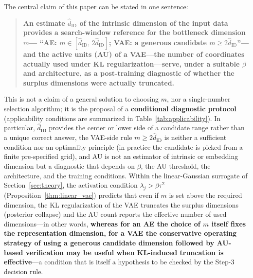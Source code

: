 \documentclass[make,article,submit,pdftex,moreauthors]{Definitions/mdpi}
\newcommand{\hatdID}{\hat{d}_{\mathrm{ID}}}
\begin{document}
The central claim of this paper can be stated in one sentence:
\begin{quote}
\textbf{An estimate $\hatdID$ of the intrinsic dimension of the input data
provides a search-window reference for the bottleneck dimension $m$---%
``AE: $m \in [\hatdID,\, 2\hatdID]$; VAE: a generous candidate
$m \geq 2\hatdID$''---and the active units (AU) of a VAE---the number of
coordinates actually used under KL regularization---serve, under a suitable
$\beta$ and architecture, as a post-training diagnostic of whether the
surplus dimensions were actually truncated.}
\end{quote}
This is not a claim of a general solution to choosing $m$, nor a
single-number selection algorithm; it is the proposal of a
\textbf{conditional diagnostic protocol}
(applicability conditions are summarized in
Table~\ref{tab:applicability}).
In particular, $\hatdID$ provides the center or lower side of a candidate
range rather than a unique correct answer, the VAE-side rule
$m \geq 2\hatdID$ is neither a sufficient condition nor an optimality
principle (in practice the candidate is picked from a finite pre-specified
grid), and AU is not an estimator of intrinsic or embedding dimension but a
diagnostic that depends on $\beta$, the AU threshold, the architecture, and
the training conditions.
Within the linear-Gaussian surrogate of Section~\ref{sec:theory}, the
activation condition $\lambda_j > \beta\tau^2$
(Proposition~\ref{thm:linear_vae}) predicts that even if $m$ is set above
the required dimension, the KL regularization of the VAE truncates the
surplus dimensions (posterior collapse) and the AU count reports the
effective number of used dimensions---in other words,
\textbf{whereas for an AE the choice of $m$ itself fixes the representation
dimension, for a VAE the conservative operating strategy of using a generous
candidate dimension followed by AU-based verification may be useful when
KL-induced truncation is effective}---a condition that is itself a
hypothesis to be checked by the Step-3 decision rule.
\end{document}
